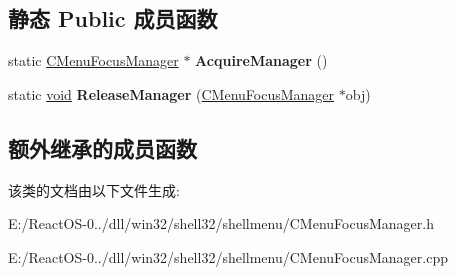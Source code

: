 \subsection*{静态 Public 成员函数}
\begin{DoxyCompactItemize}
\item 
\mbox{\label{class_c_menu_focus_manager_a1425390ec0c9b2c64f25ea85d3c1b7cd}} 
static \hyperlink{class_c_menu_focus_manager}{C\+Menu\+Focus\+Manager} $\ast$ {\bfseries Acquire\+Manager} ()
\item 
\mbox{\label{class_c_menu_focus_manager_a69089e6387e177cc34afe75806faf2b0}} 
static \hyperlink{interfacevoid}{void} {\bfseries Release\+Manager} (\hyperlink{class_c_menu_focus_manager}{C\+Menu\+Focus\+Manager} $\ast$obj)
\end{DoxyCompactItemize}
\subsection*{额外继承的成员函数}


该类的文档由以下文件生成\+:\begin{DoxyCompactItemize}
\item 
E\+:/\+React\+O\+S-\/0../dll/win32/shell32/shellmenu/C\+Menu\+Focus\+Manager.\+h\item 
E\+:/\+React\+O\+S-\/0../dll/win32/shell32/shellmenu/C\+Menu\+Focus\+Manager.\+cpp\end{DoxyCompactItemize}
